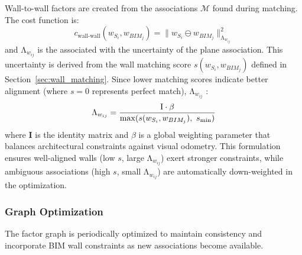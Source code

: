 Wall-to-wall factors are created from the associations $\mathcal{M}$ found during matching. The cost function is:
\begin{equation}
c_{\text{wall-wall}}(w_{S_i},w_{BIM_j}) = \big\| w_{S_i} \ominus w_{BIM_j} \big\|^2_{\mathrm{\Lambda}_{w_{ij}}}
\label{eq:plane_to_plane_cost}
\end{equation}
and $\mathrm{\Lambda}_{w_{ij}}$ is the  associated with the uncertainty of the plane association. This uncertainty is derived from the wall matching score $s(w_{S_i},w_{BIM_j})$ defined in Section~\ref{sec:wall_matching}. Since lower matching scores indicate better alignment (where $s = 0$ represents perfect match), $\mathrm{\Lambda}_{w_{ij}}$ :
\begin{equation}
\mathrm{\Lambda}_{w_{ij}} = \addtwo{\dfrac{\mathrm{I} \cdot \beta}{\max(s(w_{S_i}, w_{BIM_j}),\ s_{\min})}}
\end{equation}
where $\mathbf{I}$ is the identity matrix and $\beta$ is a global weighting parameter that balances architectural constraints against visual odometry. This formulation ensures well-aligned walls (low $s$, large $\mathrm{\Lambda}_{w_{ij}}$) exert stronger constraints, while ambiguous associations (high $s$, small $\mathrm{\Lambda}_{w_{ij}}$) are automatically down-weighted in the optimization.

\subsubsection*{\textbf{Graph Optimization}}
The factor graph is periodically optimized to maintain consistency and incorporate BIM wall constraints as new associations become available.  

